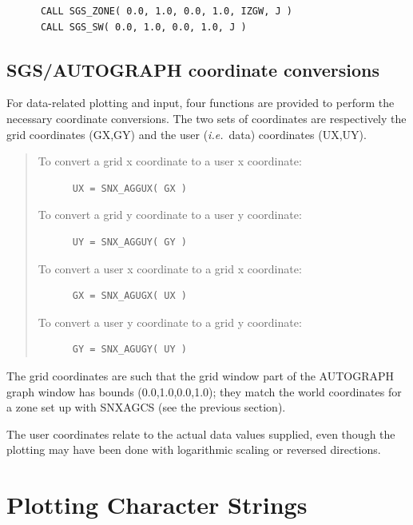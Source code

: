 \documentclass[twoside,11pt]{article}
\renewcommand{\_}{\texttt{\symbol{95}}}
\begin{document}
\begin{verbatim}
      CALL SGS_ZONE( 0.0, 1.0, 0.0, 1.0, IZGW, J )
      CALL SGS_SW( 0.0, 1.0, 0.0, 1.0, J )
\end{verbatim}


\subsection {SGS/AUTOGRAPH coordinate conversions}

For data-related plotting and input, four functions are
provided to perform the necessary coordinate conversions.
The two sets of coordinates are respectively the grid
coordinates (GX,GY) and the user ({\em i.e.}\ data) coordinates (UX,UY).

\begin{quote}
To convert a grid x coordinate to a user x coordinate:

\begin{verbatim}
      UX = SNX_AGGUX( GX )
\end{verbatim}

To convert a grid y coordinate to a user y coordinate:

\begin{verbatim}
      UY = SNX_AGGUY( GY )
\end{verbatim}

To convert a user x coordinate to a grid x coordinate:

\begin{verbatim}
      GX = SNX_AGUGX( UX )
\end{verbatim}

To convert a user y coordinate to a grid y coordinate:

\begin{verbatim}
      GY = SNX_AGUGY( UY )
\end{verbatim}
\end{quote}

The grid coordinates are such that the grid window part of
the AUTOGRAPH graph window has bounds (0.0,1.0,0.0,1.0);
they match the world coordinates for a zone set up with SNX\_AGCS
(see the previous section).

The user coordinates relate to the actual data values
supplied, even though the plotting may have been done with
logarithmic scaling or reversed directions.


\section {Plotting Character Strings}
\end{document}
